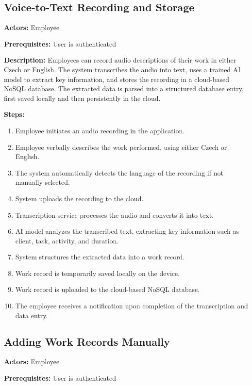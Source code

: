 \documentclass[
  digital,     %
  oneside,     %
  nosansbold,  %
  nocolorbold, %
  lof,         %
  lot,         %
]{fithesis4}
\begin{document}
\subsection{Voice-to-Text Recording and Storage}

\noindent \textbf{Actors:} Employee

\noindent \textbf{Prerequisites:} User is authenticated

\noindent \textbf{Description:}  
Employees can record audio descriptions of their work in either Czech or English. The system transcribes the audio into text, uses a trained AI model to extract key information, and stores the recording in a cloud-based NoSQL database. The extracted data is parsed into a structured database entry, first saved locally and then persistently in the cloud.

\noindent \textbf{Steps:}
\begin{enumerate}
    \item Employee initiates an audio recording in the application.
    \item Employee verbally describes the work performed, using either Czech or English.
    \item The system automatically detects the language of the recording if not manually selected.
    \item System uploads the recording to the cloud.
    \item Transcription service processes the audio and converts it into text.
    \item AI model analyzes the transcribed text, extracting key information such as client, task, activity, and duration.
    \item System structures the extracted data into a work record.
    \item Work record is temporarily saved locally on the device.
    \item Work record is uploaded to the cloud-based NoSQL database.
    \item The employee receives a notification upon completion of the transcription and data entry.
\end{enumerate}

\subsection{Adding Work Records Manually}

\noindent \textbf{Actors:} Employee

\noindent \textbf{Prerequisites:} User is authenticated
\end{document}
